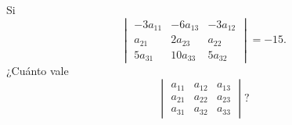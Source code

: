 \documentclass[12pt,a4paper]{article}
\begin{document}
        
    \thispagestyle{empty}
    

    \begin{problema}
        Si
        \begin{equation*}
            \begin{vmatrix}
                -3a_{11} & -6a_{13} & -3a_{12}\\
                a_{21} & 2a_{23} & a_{22}\\
                5a_{31} & 10a_{33} & 5a_{32}
            \end{vmatrix}
            =-15.
        \end{equation*}
        ¿Cuánto vale
        \begin{equation*}
            \begin{vmatrix}
                a_{11} & a_{12} & a_{13}\\
                a_{21} & a_{22} & a_{23}\\
                a_{31} & a_{32} & a_{33}
            \end{vmatrix}
            ?
        \end{equation*}
    \end{problema}
\end{document}

